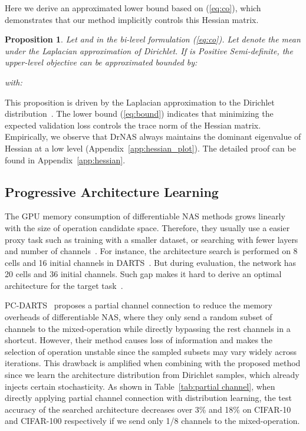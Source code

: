 \documentclass{article} \usepackage{iclr2021_conference,times}
\newtheorem{prop}{Proposition}
\begin{document}
Here we derive an approximated lower bound based on (\ref{eq:co}), which demonstrates that our method implicitly controls this Hessian matrix.
\begin{prop}
    \label{prop:hessian}
    Let  and  in the bi-level formulation (\ref{eq:co}).
    Let  denote the mean under the Laplacian approximation of Dirichlet.
    If  is Positive Semi-definite, 
    the upper-level objective can be approximated bounded by:
    
    with:
    
\end{prop}
This proposition is driven by the Laplacian approximation to the Dirichlet distribution~\citep{laplace,topic}.
The lower bound (\ref{eq:bound}) indicates that minimizing the expected validation loss controls the trace norm of the Hessian matrix.
Empirically, we observe that DrNAS always maintains the dominant eigenvalue of Hessian at a low level (Appendix~\ref{app:hessian_plot}).
The detailed proof can be found in Appendix~\ref{app:hessian}.


\subsection{Progressive Architecture Learning}
\label{subsec:pal}
The GPU memory consumption of differentiable NAS methods grows linearly with the size of operation candidate space. 
Therefore, they usually use a easier proxy task such as training with a smaller dataset, or searching with fewer layers and number of channels~\citep{proxylessnas}. 
For instance, the architecture search is performed on 8 cells and 16 initial channels in DARTS~\citep{darts}.
But during evaluation, the network has 20 cells and 36 initial channels.
Such gap makes it hard to derive an optimal architecture for the target task~\citep{proxylessnas}.


PC-DARTS~\citep{pcdarts} proposes a partial channel connection to reduce the memory overheads of differentiable NAS, where they only send a random subset of channels to the mixed-operation while directly bypassing the rest channels in a shortcut. However, their method causes loss of information and makes the selection of operation unstable since the sampled subsets may vary widely across iterations. 
This drawback is amplified when combining with the proposed method since we learn the architecture distribution from Dirichlet samples, which already injects certain stochasticity.
As shown in Table~\ref{tab:partial channel}, when directly applying partial channel connection with distribution learning,
the test accuracy of the searched architecture  decreases over 3\% and 18\% on CIFAR-10 and CIFAR-100 respectively if we send only 1/8 channels to the mixed-operation.
\end{document}
